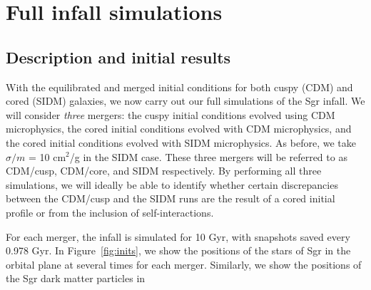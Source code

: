 \hypertarget{full-infall-simulations}{%
\chapter{Full infall simulations}\label{full-infall-simulations}}

\hypertarget{description-and-initial-results}{%
\section{Description and initial
results}\label{description-and-initial-results}}

With the equilibrated and merged initial conditions for both cuspy (CDM) and
cored (SIDM) galaxies, we now carry out our full simulations of the Sgr
infall.  We will consider \emph{three} mergers: the cuspy initial conditions
evolved using CDM microphysics, the cored initial conditions evolved with CDM
microphysics, and the cored initial conditions evolved with SIDM microphysics.
As before, we take \(\sigma / m\) = 10 cm\(^2\)/g in the SIDM case.  These
three mergers will be referred to as CDM/cusp, CDM/core, and SIDM
respectively.  By performing all three simulations, we will ideally be able to
identify whether certain discrepancies between the CDM/cusp and the SIDM runs
are the result of a cored initial profile or from the inclusion of
self-interactions.

For each merger, the infall is simulated for 10 Gyr, with snapshots saved
every 0.978 Gyr.  In Figure~\ref{fig:inits}, we show the positions of the
stars of Sgr in the orbital plane at several times for each merger.
Similarly, we show the positions of the Sgr dark matter particles in

